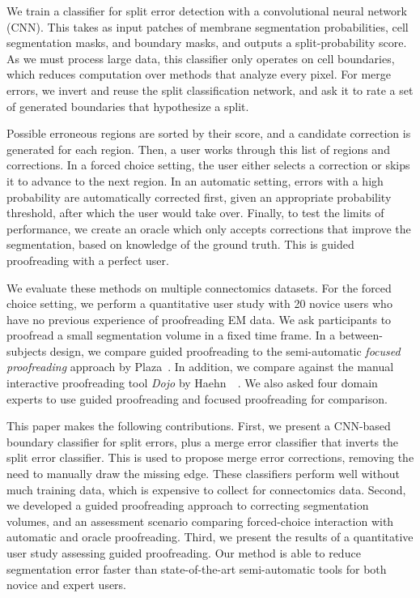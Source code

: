 We train a classifier for split error detection with a convolutional neural network
(CNN). This takes as input patches of membrane segmentation probabilities, cell
segmentation masks, and boundary masks, and outputs a split-probability score. As we
must process large data, this classifier only operates on cell boundaries, which
reduces computation over methods that analyze every pixel. For merge errors, we
invert and reuse the split classification network, and ask it to rate a
set of generated boundaries that hypothesize a split. %

Possible erroneous regions are sorted by their score, and a candidate correction is generated for each
region. Then, a user works through this list of regions and corrections. In a
forced choice setting, the user either selects a correction or skips it to
advance to the next region. In an automatic setting, errors with a high probability are automatically corrected first, given an appropriate
probability threshold, after which the user would take over. Finally, to test
the limits of performance, we create an oracle which only accepts corrections
that improve the segmentation, based on knowledge of the ground truth. This is
guided proofreading with a perfect user.

We evaluate these methods on multiple connectomics datasets. For the forced
choice setting, we perform a quantitative user study with 20 novice users who
have no previous experience of proofreading EM data. We ask participants to
proofread a small segmentation volume in a fixed time frame. In a
between-subjects design, we compare guided proofreading to the semi-automatic
\textit{focused proofreading} approach by Plaza~\cite{focused_proofreading}. In
addition, we compare against the manual interactive proofreading tool
\textit{Dojo} by Haehn~\etal~\cite{haehn_dojo_2014}. We also asked four domain
experts to use guided proofreading and focused proofreading for comparison.

This paper makes the following contributions.
%
First, we present a CNN-based boundary classifier for split errors, plus a merge
error classifier that inverts the split error classifier. This is used to
propose merge error corrections, removing the need to manually draw the missing
edge. These classifiers perform well without much training data, which is
expensive to collect for connectomics data.
%
Second, we developed a guided proofreading approach to correcting segmentation
volumes, and an assessment scenario comparing forced-choice interaction with
automatic and oracle proofreading.
%
Third, we present the results of a quantitative user study assessing
guided proofreading. Our method is able to reduce segmentation
error faster than state-of-the-art semi-automatic tools for both novice and
expert users.
%


